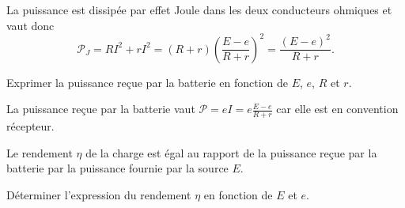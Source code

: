 
\begin{corrige}
La puissance est dissipée par effet Joule dans les deux conducteurs ohmiques et vaut donc 
\[
\mathcal{P}_J=RI^2+rI^2=(R+r)\left(\frac{E-e}{R+r}\right)^2 =\frac{(E-e)^2}{R+r}.
\]
\end{corrige}




\begin{enonce}
Exprimer la puissance reçue par la batterie en fonction de $E$, $e$, $R$ et $r$.

\end{enonce}


\begin{corrige}
La puissance reçue par la batterie vaut $\mathcal{P}=eI=e\frac{E-e}{R+r}$ car elle est en convention récepteur.
\end{corrige}





\debutEntrainement

\bigskip

Le rendement $\eta$ de la charge est égal au rapport de la puissance reçue par la batterie par la puissance fournie par la source $E$.


\finEntrainement





\begin{enonce}
Déterminer l'expression du rendement $\eta$  en fonction de $E$ et  $e$.

\end{enonce}


